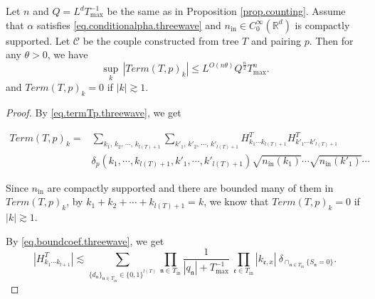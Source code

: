 \begin{lem}\label{lem.Tpvariance} Let $n$ and $Q=L^dT^{-1}_{\text{max}}$ be the same as in Proposition \ref{prop.counting}. Assume that $\alpha$ satisfies \eqref{eq.conditionalpha.threewave} and $n_{\mathrm{in}} \in C^\infty_0(\mathbb{R}^d)$ is compactly supported. Let $\mathcal{C}$ be the couple constructed from tree $T$ and pairing $p$. Then for any $\theta>0$, we have
\begin{equation}
    \sup_k\, |Term(T,p)_k|\le L^{O(n\theta)} Q^{\frac{n}{2}} T_{\text{max}}^{n}.
\end{equation}
and $Term(T,p)_k=0$ if $|k|\gtrsim 1$.
\end{lem}
\begin{proof} By \eqref{eq.termTp.threewave}, we get

\begin{equation}
\begin{split}
    Term(T, p)_k=&\sum_{k_1,\, k_2,\, \cdots,\, k_{l(T)+1}}\sum_{k'_1,\, k'_2,\, \cdots,\, k'_{l(T)+1}} H^T_{k_1\cdots k_{l(T)+1}} H^{T}_{k'_1\cdots k'_{l(T)+1}}
    \\
    & \delta_{p}(k_1,\cdots, k_{l(T)+1}, k'_1,\cdots, k'_{l(T)+1})\sqrt{n_{\textrm{in}}(k_1)}\cdots\sqrt{n_{\textrm{in}}(k'_1)}\cdots
\end{split}
\end{equation}

Since $n_{\mathrm{in}}$ are compactly supported and there are bounded many of them in $Term(T, p)_k$, by $k_1 + k_2 + \cdots + k_{l(T)+1}=k$, we know that $Term(T, p)_k=0$ if $|k|\gtrsim 1$.

By \eqref{eq.boundcoef.threewave}, we get  %
\begin{equation}\label{eq.termlemmaeq1.threewave}
    |H^T_{k_1\cdots k_{l+1}}|\lesssim \sum_{\{d_{\mathfrak{n}}\}_{\mathfrak{n}\in T_{\text{in}}}\in\{0,1\}^{l(T)}}\prod_{\mathfrak{n}\in T_{\text{in}}}\frac{1}{|q_{\mathfrak{n}}|+T^{-1}_{\text{max}}}\ \prod_{\mathfrak{e}\in T_{\text{in}}}|k_{\mathfrak{e},x}|\ \delta_{\cap_{\mathfrak{n}\in T_{\text{in}}} \{S_{\mathfrak{n}}=0\}}.
\end{equation}






\end{proof}
